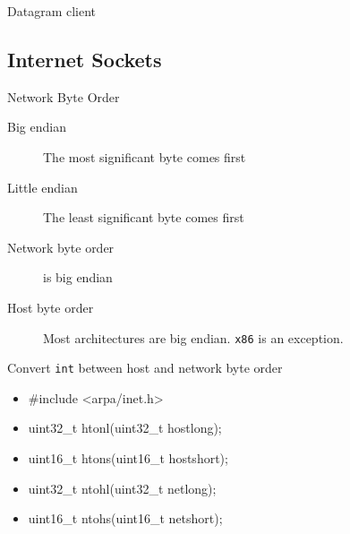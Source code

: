 \begin{frame}
  \begin{description}
  \item[Datagram client] 
  \end{description}

\end{frame}

\subsection{Internet Sockets}
\label{sec:internet-sockets}

\begin{frame}{Network Byte Order}
  \begin{description}
  \item[Big endian] The most significant byte comes first
  \item[Little endian] The least significant byte comes first
  \end{description}
  \begin{center}
  \end{center}
  \begin{description}
  \item[Network byte order] is big endian
  \item[Host byte order] Most architectures are big endian. \texttt{x86} is an exception.
  \end{description}
\end{frame}

\begin{frame}
  \begin{block}{Convert \texttt{int} between host and network byte order}
    \ttfamily
    \begin{itemize}
      \item[] \#include <arpa/inet.h>
      \item[] uint32\_t htonl(uint32\_t hostlong);
      \item[] uint16\_t htons(uint16\_t hostshort);
      \item[] uint32\_t ntohl(uint32\_t netlong);
      \item[] uint16\_t ntohs(uint16\_t netshort);
    \end{itemize}
  \end{block}
\end{frame}

